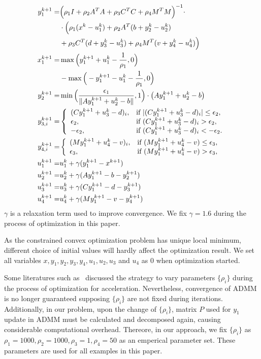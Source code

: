 \documentclass[review]{acmsiggraph}
\begin{document}
\begin{align}
y_1^{k+1}=&\Big( \rho_1 I+ \rho_2 A^TA+ \rho_3 C^TC+ \rho_4 M^TM\Big)^{-1}\cdot\notag\\
&\cdot\Big(\rho_1 (x^k-u_1^k)+\rho_2 A^T(b+y_2^k-u_2^k)\notag\\ &+ \rho_3 C^T(d+y_3^k-u_3^k)+\rho_4 M^T(v+y_4^k-u_4^k)\Big)\\
x_1^{k+1}=&\max\Big(y_1^{k+1}+u_1^k-\frac{1}{\rho_1}, 0\Big) \notag\\&- \max\Big(-y_1^{k+1}-u_1^k-\frac{1}{\rho_1}, 0\Big)\\
y_2^{k+1}=&\min\Big(\frac{\epsilon_1}{\|Ay_1^{k+1}+u_2^k-b\|},1\Big)\cdot\big(Ay_1^{k+1}+u_2^k-b\big)\\
y_{3,i}^{k+1}=&\left\{
\begin{array}{ll}
(Cy_1^{k+1}+u_3^k-d)_i, &\mbox{if }|(Cy_1^{k+1}+u_3^k-d)_i|\leq\epsilon_2,\\
\epsilon_2, &\mbox{if }(Cy_1^{k+1}+u_3^k-d)_i>\epsilon_2,\\
-\epsilon_2, &\mbox{if }(Cy_1^{k+1}+u_3^k-d)_i<-\epsilon_2.\\
\end{array}
\right.\\
y_{4,i}^{k+1}=&\left\{
\begin{array}{ll}
(My_1^{k+1}+u_4^k-v)_i, &\mbox{if }(My_1^{k+1}+u_4^k-v)\leq\epsilon_3,\\
\epsilon_3, &\mbox{if }(My_1^{k+1}+u_4^k-v)>\epsilon_3,\\
\end{array}
\right.\\
u_1^{k+1}=&u_1^k+\gamma(y_1^{k+1}-x^{k+1})\\
u_2^{k+1}=&u_2^k+\gamma(Ay_1^{k+1}-b-y_2^{k+1})\\
u_3^{k+1}=&u_3^k+\gamma(Cy_1^{k+1}-d-y_3^{k+1})\\
u_4^{k+1}=&u_4^k+\gamma(My_1^{k+1}-v-y_4^{k+1})
\end{align}
$\gamma$ is a relaxation term used to improve convergence. We fix $\gamma=1.6$ during the process of optimization in this paper. 

As the constrained convex optimization problem has unique local minimum, different choice of initial values will hardly affect the optimization result. We set all variables $x, y_1, y_2, y_3, y_4, u_1, u_2, u_3$ and $u_4$ as 0 when optimization started. 

Some literatures such as~\cite{he2000alternating,wang2001decomposition} discussed the strategy to vary parameters $\{\rho_i\}$ during the process of optimization for acceleration. Nevertheless, convergence of ADMM is no longer guaranteed supposing $\{\rho_i\}$ are not fixed during iterations. Additionally, in our problem, upon the change of $\{\rho_i\}$, matrix $P$ used for $y_1$ update in ADMM must be calculated and decomposed again, causing considerable computational overhead. Thereore, in our approach, we fix $\{\rho_i\}$ as $\rho_1=1000, \rho_2=1000, \rho_3=1, \rho_4=50$ as an emperical parameter set. These parameters are used for all examples in this paper.


\end{document}
